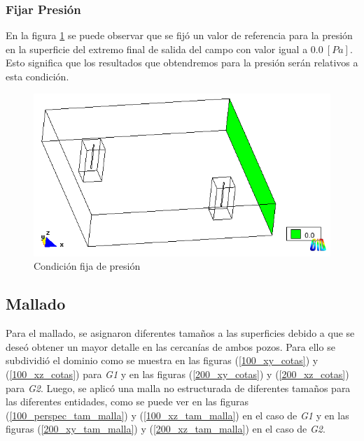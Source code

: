 \documentclass[10pt,a4paper,final]{article}
\begin{document}
\subsubsection{Fijar Presión}
En la figura \ref{100_condiciones_presion0} se puede observar que se fijó un valor de referencia para la presión en la superficie del extremo final de salida del campo con valor igual a $0.0~\left[Pa\right]$. Esto significa que los resultados que obtendremos para la presión serán relativos a esta condición.

\begin{figure}[tbhp]
\centerline{\includegraphics[scale=0.5]{img/100m/100_condiciones_presion0}}
\caption{Condición fija de presión}
\label{100_condiciones_presion0}
\end{figure}
\subsection{Mallado}
Para el mallado, se asignaron diferentes tamaños a las superficies debido a que se deseó obtener un mayor detalle en las cercanías de ambos pozos. Para ello se subdividió el dominio como se muestra en las figuras (\ref{100_xy_cotas}) y (\ref{100_xz_cotas}) para \emph{G1} y en las figuras (\ref{200_xy_cotas}) y (\ref{200_xz_cotas}) para \emph{G2}. Luego, se aplicó una malla no estructurada de diferentes tamaños para las diferentes entidades, como se puede ver en las figuras (\ref{100_perspec_tam_malla}) y (\ref{100_xz_tam_malla}) en el caso de \emph{G1} y en las figuras (\ref{200_xy_tam_malla}) y (\ref{200_xz_tam_malla}) en el caso de \emph{G2}.
\end{document}
